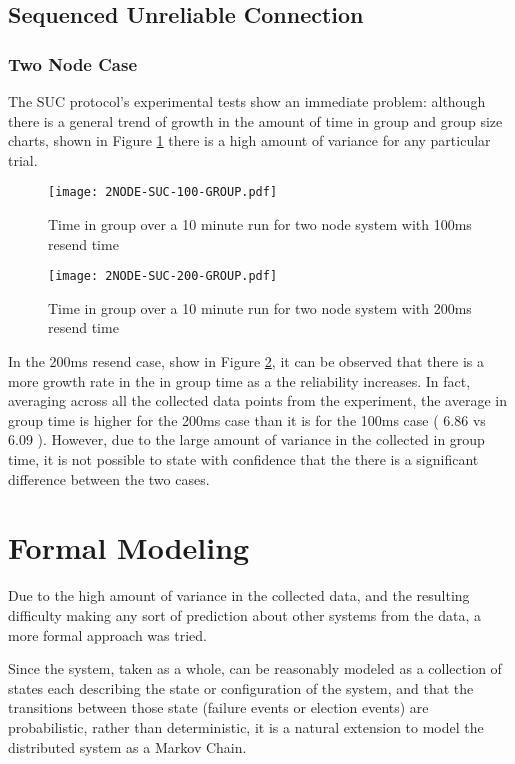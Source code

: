\subsection{Sequenced Unreliable Connection}

\subsubsection{Two Node Case}

The SUC protocol's experimental tests show an immediate problem: although there
is a general trend of growth in the amount of time in group and group size
charts, shown in Figure \ref{fig:IGT-SUC-2NODE-100}
there is a high amount of variance for any particular trial.

\begin{figure}[!h]
\centering
\texttt{[image: 2NODE-SUC-100-GROUP.pdf]}
\caption{Time in group over a 10 minute run for two node system with 100ms resend time}
\label{fig:IGT-SUC-2NODE-100}
\end{figure}

\begin{figure}[!h]
\centering
\texttt{[image: 2NODE-SUC-200-GROUP.pdf]}
\caption{Time in group over a 10 minute run for two node system with 200ms resend time}
\label{fig:IGT-SUC-2NODE-200}
\end{figure}

In the 200ms resend case, show in Figure \ref{fig:IGT-SUC-2NODE-200}, it can be 
observed that there is a more growth rate in the in group time as a the
reliability increases. In fact, averaging across all the collected data points
from the experiment, the average in group time is higher for the 200ms case
than it is for the 100ms case ( 6.86 vs 6.09 ). However, due to the large amount
of variance in the collected in group time, it is not possible to state with
confidence that the there is a significant difference between the two cases.

\section{Formal Modeling}

Due to the high amount of variance in the collected data, and the resulting
difficulty making any sort of prediction about other systems from the data, a
more formal approach was tried.

Since the system, taken as a whole, can be reasonably modeled as a collection of 
states each describing the state or configuration of the system, and that the
transitions between those state (failure events or election events) are probabilistic,
rather than deterministic, it is a natural extension to model the distributed
system as a Markov Chain.

